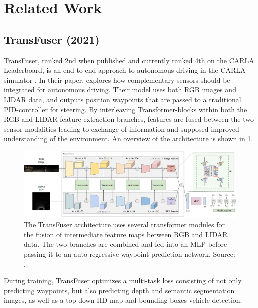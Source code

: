 \section{Related Work}
\label{sec:related-work}

\subsection{TransFuser (2021)}
\label{sec:related-work:transfuser}
TransFuser, ranked 2nd when published and currently ranked 4th on the CARLA Leaderboard,
is an end-to-end approach to autonomous driving in the CARLA simulator
\cite{transfuser-pami, transfuser-cvpr, pwc-carla}.
In their paper, \textcite{transfuser-pami} explores how complementary sensors should be integrated for autonomous driving. Their model uses both RGB images and LIDAR data, and outputs position waypoints that are passed to a traditional PID-controller for steering.
By interleaving Transformer-blocks within both the RGB and LIDAR feature extraction branches,
features are fused between the two sensor modalities leading to exchange of information and supposed improved understanding of the environment. An overview of the architecture is shown in \cref{fig:transfuser-architecture}.

\begin{figure}[htbp]
    \centering
    \includegraphics[width=\textwidth]{chapters/2-background/figures/transfuser-architecture.png}
    \caption{The TransFuser architecture uses several transformer modules for the fusion of intermediate feature maps between RGB and LIDAR data. The two branches are combined and fed into an MLP before passing it to an auto-regressive waypoint prediction network.  Source: \cite{transfuser-pami}.}
    \label{fig:transfuser-architecture}
\end{figure}

During training, TransFuser optimizes a multi-task loss consisting of not only predicting waypoints,
but also predicting depth and semantic segmentation images,
as well as a top-down HD-map and bounding boxes vehicle detection.

